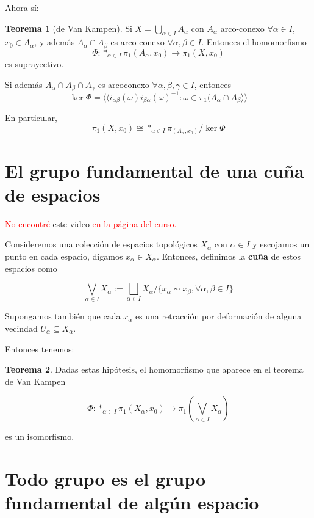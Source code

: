 \documentclass[spanish]{book}
\theoremstyle{definition}
\newtheorem*{teo}{Teorema}
\begin{document}
	Ahora sí:
	
	\begin{teo}[de Van Kampen]
		Si $X=\bigcup_{\alpha\in I}A_\alpha$ con $A_\alpha$ arco-conexo $\forall\alpha\in I$, $x_0\in A_\alpha$, y además $A_\alpha\cap A_\beta$ es arco-conexo $\forall\alpha,\beta\in I$. Entonces el homomorfismo
		\[\Phi:\ast_{\alpha\in I}\pi_1(A_\alpha,x_0)\to\pi_1(X,x_0)\]
		es suprayectivo.
		
		Si además $A_\alpha\cap A_\beta\cap A_\gamma$ es arcoconexo $\forall\alpha,\beta,\gamma\in I$, entonces
		\[\ker\Phi=\langle\langle i_{\alpha\beta}(\omega)i_{\beta\alpha}(\omega)^{-1}:\omega\in\pi_1(A_\alpha\cap A_\beta\rangle\rangle\]
		
		En particular,\[\pi_1(X,x_0)\cong \ast_{\alpha\in I}\pi_(A_\alpha,x_0)/\ker\Phi\]
	\end{teo}
	
\section{El grupo fundamental de una cuña de espacios}\label{sec:grp-fund-cuña}
		\textcolor{red}{No encontré \href{https://www.youtube.com/watch?v=9P6n__Njlz8}{este video} en la página del curso.}
		
		Consideremos una colección de espacios topológicos $X_\alpha$ con $\alpha\in I$ y escojamos un punto en cada espacio, digamos $x_\alpha\in X_\alpha$. Entonces, definimos la \textbf{cuña} de estos espacios como
		
		\[\bigvee_{\alpha\in I}X_\alpha:=\bigsqcup_{\alpha\in I}X_\alpha\Big/\{x_\alpha\sim{}x_\beta,\forall\alpha,\beta\in I\}\]
		
		Supongamos también que cada $x_\alpha$ es una retracción por deformación de alguna vecindad $U_\alpha\subseteq X_\alpha$.
		
		Entonces tenemos:
		
		\begin{teo}
			Dadas estas hipótesis, el homomorfismo que aparece en el teorema de Van Kampen
			
			\[\Phi:\ast_{\alpha\in I}\pi_1(X_\alpha,x_0)\to \pi_1(\bigvee_{\alpha\in I}X_\alpha)\]
			
			es un isomorfismo.
		\end{teo}

\section{Todo grupo es el grupo fundamental de algún espacio}
\end{document}
